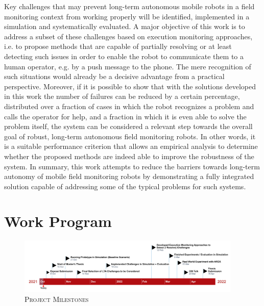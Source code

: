 \documentclass[english, master, expose, utf8]{base/thesis_KBS}
\begin{document}
Key challenges that may prevent long-term autonomous mobile robots in a field monitoring context from working properly will be identified, implemented 
in a simulation and systematically evaluated. A major objective of this work is to address a subset of these challenges based on execution monitoring approaches,
i.e. to propose methods that are capable of partially resolving or at least detecting such issues in order to enable the robot to communicate them to a human operator,
e.g. by a push message to the phone. The mere recognition of such situations would already be a decisive advantage from a practical perspective. Moreover, if it is possible
to show that with the solutions developed in this work the number of failures can be reduced by a certain percentage, distributed over a fraction of cases in which the robot 
recognizes a problem and calls the operator for help, and a fraction in which it is even able to solve the problem itself, the system can be considered a relevant step towards 
the overall goal of robust, long-term autonomous field monitoring robots. In other words, it is a suitable performance criterion that allows an empirical analysis to
determine whether the proposed methods are indeed able to improve the robustness of the system. In summary, this work attempts to reduce the barriers towards long-term
autonomy of mobile field monitoring robots by demonstrating a fully integrated solution capable of addressing some of the typical problems for such systems.

\section{Work Program}

\begin{figure}[H]
    \includegraphics[width=0.95\textwidth]{pics/work_program.png}
    \caption{\textsc{Project Milestones}}
    \label{fig:work_program}
\end{figure}


\end{document}

